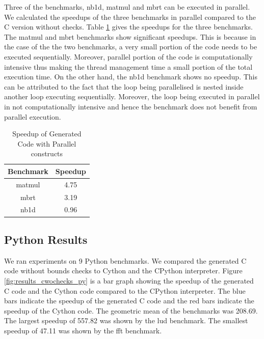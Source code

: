 Three of the \matlab benchmarks, nb1d, matmul and mbrt can be executed in parallel. We calculated the speedups of the three benchmarks in parallel compared to the C version without checks. Table \ref{tab:cpvscwo} gives the speedups for the three benchmarks. The matmul and mbrt benchmarks show significant speedups. This is because in the case of the the two benchmarks, a very small portion of the code needs to be executed sequentially. Moreover, parallel portion of the code is computationally intensive thus making the thread management time a small portion of the total execution time. On the other hand, the nb1d benchmark shows no speedup. This can be attributed to the fact that the loop being parallelised is nested inside another loop executing sequentially. Moreover, the loop being executed in parallel in not computationally intensive and hence the benchmark does not benefit from parallel execution. 
\begin{table}[htbp]
\centering
\begin{tabular}{|c|c|}
\hline
Benchmark & Speedup \\ \hline
matmul    & 4.75    \\ \hline
mbrt      & 3.19    \\ \hline
nb1d      & 0.96    \\ \hline
\end{tabular}
\caption{Speedup of Generated Code with Parallel constructs}
\label{tab:cpvscwo}
\end{table}


\subsection{Python Results}
We ran experiments on 9 Python benchmarks. We compared the generated C code without bounds checks to Cython and the CPython interpreter. Figure \ref{fig:results_cwochecks_py} is a bar graph showing the speedup of the generated C code and the Cython code compared to the CPython interpreter. The blue bars indicate the speedup of the generated C code and the red bars indicate the speedup of the Cython code. The geometric mean of the benchmarks was 208.69. The largest speedup of 557.82  was shown by the lud benchmark. The smallest speedup of 47.11 was shown by the fft benchmark. 

